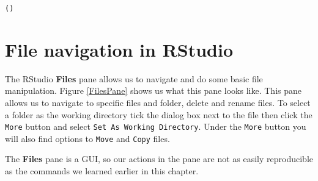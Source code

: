 \begin{knitrout}
\color{fgcolor}\begin{kframe}
\begin{alltt}
()
\end{alltt}
\end{kframe}
\end{knitrout}



\section{File navigation in RStudio}

The RStudio \textbf{Files} pane allows us to navigate and do some basic file manipulation. Figure \ref{FilesPane} shows us what this pane looks like. This pane allows us to navigate to specific files and folder, delete and rename files. To select a folder as the working directory tick the dialog box next to the file then click the \texttt{More} button and select \texttt{Set As Working Directory}. Under the \texttt{More} button you will also find options to \texttt{Move} and \texttt{Copy} files.

The \textbf{Files} pane is a GUI, so our actions in the  pane are not as easily reproducible as the commands we learned earlier in this chapter. 

